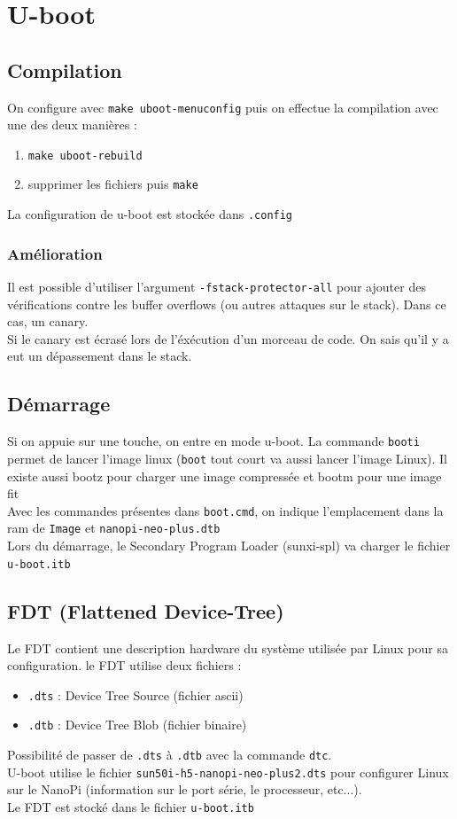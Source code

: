\documentclass[resume]{subfiles}
\begin{document}
\section{U-boot}
\subsection{Compilation}
On configure avec \verb!make uboot-menuconfig! puis on effectue la compilation avec une des deux manières :
\begin{enumerate}
\item \verb!make uboot-rebuild!
\item supprimer les fichiers puis \verb!make!
\end{enumerate}
La configuration de u-boot est stockée dans \verb!.config!
\subsubsection{Amélioration}
Il est possible d'utiliser l'argument \verb!-fstack-protector-all! pour ajouter des vérifications contre les buffer overflows (ou autres attaques sur le stack). Dans ce cas, un canary.\\
Si le canary est écrasé lors de l'éxécution d'un morceau de code. On sais qu'il y a eut un dépassement dans le stack.
\subsection{Démarrage}
Si on appuie sur une touche, on entre en mode u-boot. La commande \verb!booti! permet de lancer l'image linux (\verb!boot! tout court va aussi lancer l'image Linux). Il existe aussi bootz pour charger une image compressée et bootm pour une image fit\\
Avec les commandes présentes dans \verb!boot.cmd!, on indique l'emplacement dans la ram de \verb!Image! et \verb!nanopi-neo-plus.dtb!\\
Lors du démarrage, le Secondary Program Loader (sunxi-spl) va charger le fichier \verb!u-boot.itb!
\subsection{FDT (Flattened Device-Tree)}
Le FDT contient une description hardware du système utilisée par Linux pour sa configuration. le FDT utilise deux fichiers :
\begin{itemize}
\item \verb!.dts! : Device Tree Source (fichier ascii)
\item \verb!.dtb! : Device Tree Blob (fichier binaire)
\end{itemize}
Possibilité de passer de \verb!.dts! à \verb!.dtb! avec la commande \verb!dtc!.\\
U-boot utilise le fichier \verb!sun50i-h5-nanopi-neo-plus2.dts! pour configurer Linux sur le NanoPi (information sur le port série, le processeur, etc...).\\
Le FDT est stocké dans le fichier \verb!u-boot.itb!
\end{document}
